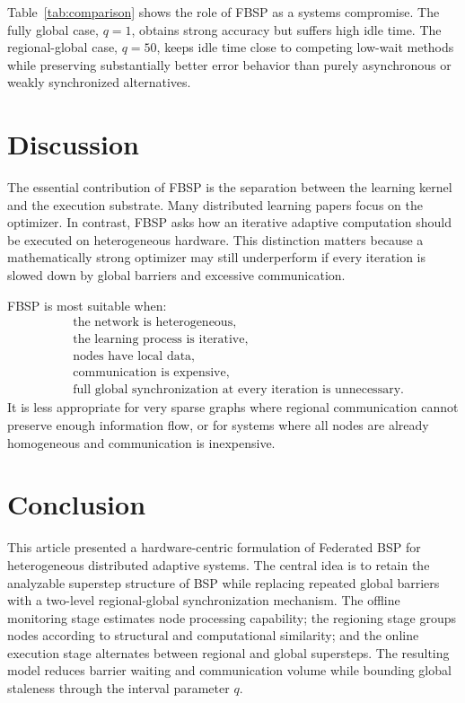 ﻿\documentclass[10pt,journal]{IEEEtran}
\begin{document}
	Table~\ref{tab:comparison} shows the role of FBSP as a systems compromise. The fully global case, $q=1$, obtains strong accuracy but suffers high idle time. The regional-global case, $q=50$, keeps idle time close to competing low-wait methods while preserving substantially better error behavior than purely asynchronous or weakly synchronized alternatives.
	
	\section{Discussion}
	
	The essential contribution of FBSP is the separation between the learning kernel and the execution substrate. Many distributed learning papers focus on the optimizer. In contrast, FBSP asks how an iterative adaptive computation should be executed on heterogeneous hardware. This distinction matters because a mathematically strong optimizer may still underperform if every iteration is slowed down by global barriers and excessive communication.
	
	FBSP is most suitable when:
	\[
	\begin{aligned}
		&\text{the network is heterogeneous,}\\
		&\text{the learning process is iterative,}\\
		&\text{nodes have local data,}\\
		&\text{communication is expensive,}\\
		&\text{full global synchronization at every iteration is unnecessary.}
	\end{aligned}
	\]
	It is less appropriate for very sparse graphs where regional communication cannot preserve enough information flow, or for systems where all nodes are already homogeneous and communication is inexpensive.
	
	\section{Conclusion}
	
	This article presented a hardware-centric formulation of Federated BSP for heterogeneous distributed adaptive systems. The central idea is to retain the analyzable superstep structure of BSP while replacing repeated global barriers with a two-level regional-global synchronization mechanism. The offline monitoring stage estimates node processing capability; the regioning stage groups nodes according to structural and computational similarity; and the online execution stage alternates between regional and global supersteps. The resulting model reduces barrier waiting and communication volume while bounding global staleness through the interval parameter $q$.
	
\end{document}
